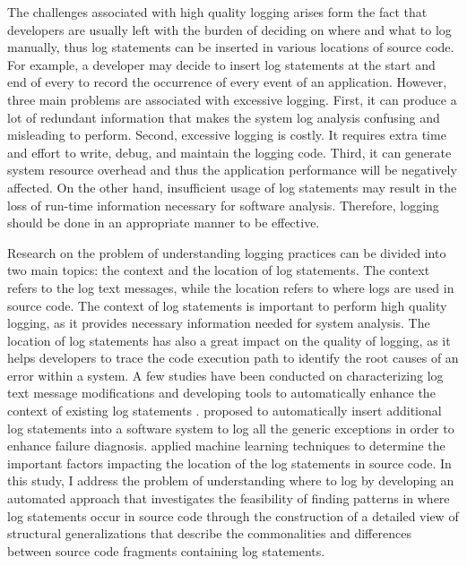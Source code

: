 The challenges associated with high quality logging arises form the fact that developers are usually left with the burden of deciding on where and what to log manually, thus log statements can be inserted in various locations of source code. For example, a developer may decide to insert log statements at the start and end of every  to record the occurrence of every event of an application. However, three main problems are associated with excessive logging. First, it can produce a lot of redundant information that makes the system log analysis confusing and misleading to perform. Second, excessive logging is costly. It requires extra time and effort to write, debug, and maintain the logging code. Third, it can generate system resource overhead and thus the application performance will be negatively affected. On the other hand, insufficient usage of log statements may result in the loss of run-time information necessary for software analysis. Therefore, logging should be done in an appropriate manner to be effective.


Research on the problem of understanding logging practices can be divided into two main topics: the context and the location of log statements. The context refers to the log text messages, while the location refers to where logs are used in source code. The context of log statements is important to perform high quality logging, as it provides necessary information needed for system analysis. The location of log statements has also a great impact on the quality of logging, as it helps developers to trace the code execution path to identify the root causes of an error within a system. A few studies have been conducted on characterizing log text message modifications \cite{yuan2012characterizing} and developing tools to automatically enhance the context of existing log statements \cite{yuan2012improving, yuan2010sherlog}. \citet{yuan2012conservative} proposed  to automatically insert additional log statements into a software system to log all the generic exceptions in order to enhance failure diagnosis. \citet{zhu2015learning} applied machine learning techniques to determine the important factors impacting the location of the log statements in source code. In this study, I address the problem of understanding where to log by developing an automated approach that investigates the feasibility of finding patterns in where log statements occur in source code through the construction of a detailed view of structural generalizations that describe the commonalities and differences between source code fragments containing log statements.


